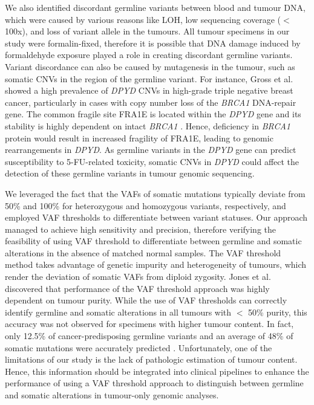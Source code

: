 \documentclass{bmcart}
\begin{document}
We also identified discordant germline variants between blood and tumour DNA, which were caused by various reasons like LOH, low sequencing coverage ($<$ 100x), and loss of variant allele in the tumours. All tumour specimens in our study were formalin-fixed, therefore it is possible that DNA damage induced by formaldehyde exposure played a role in creating discordant germline variants. Variant discordance can also be caused by mutagenesis in the tumour, such as somatic CNVs in the region of the germline variant. For instance, Gross et al. \cite{Gross2013} showed a high prevalence of \textit{DPYD} CNVs in high-grade triple negative breast cancer, particularly in cases with copy number loss of the \textit{BRCA1} DNA-repair gene. The common fragile site FRA1E is located within the \textit{DPYD} gene and its stability is highly dependent on intact \textit{BRCA1} \cite{Arlt2004}. Hence, deficiency in \textit{BRCA1} protein would result in increased fragility of FRA1E, leading to genomic rearrangements in \textit{DPYD}. As germline variants in the \textit{DPYD} gene can predict susceptibility to 5-FU-related toxicity, somatic CNVs in \textit{DPYD} could affect the detection of these germline variants in tumour genomic sequencing.

We leveraged the fact that the VAFs of somatic mutations typically deviate from 50\% and 100\% for heterozygous and homozygous variants, respectively, and employed VAF thresholds to differentiate between variant statuses. Our approach managed to achieve high sensitivity and precision, therefore verifying the feasibility of using VAF threshold to differentiate between germline and somatic alterations in the absence of matched normal samples. The VAF threshold method takes advantage of genetic impurity and heterogeneity of tumours, which render the deviation of somatic VAFs from diploid zygosity. Jones et al. \cite{Jones2015a} discovered that performance of the VAF threshold approach was highly dependent on tumour purity. While the use of VAF thresholds can correctly identify germline and somatic alterations in all tumours with $<$ 50\% purity, this accuracy was not observed for specimens with higher tumour content. In fact, only 12.5\% of cancer-predisposing germline variants and an average of 48\% of somatic mutations were accurately predicted \cite{Jones2015a}. Unfortunately, one of the limitations of our study is the lack of pathologic estimation of tumour content. Hence, this information should be integrated into clinical pipelines to enhance the performance of using a VAF threshold approach to distinguish between germline and somatic alterations in tumour-only genomic analyses.
\end{document}
